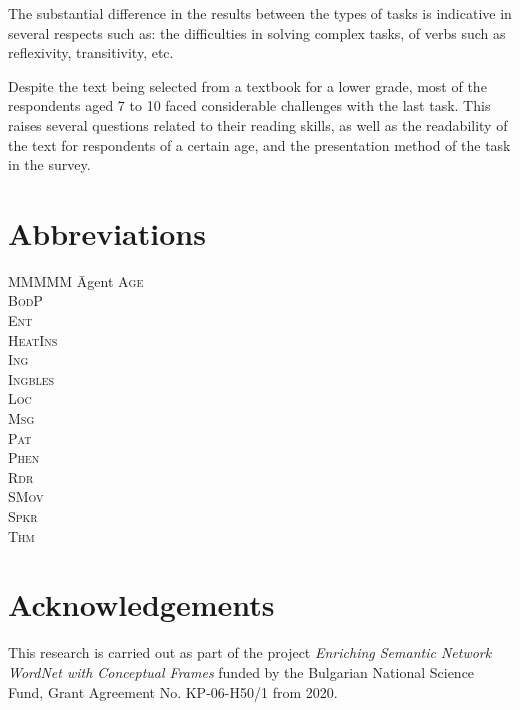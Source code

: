 \documentclass[output=paper,colorlinks,citecolor=brown]{langscibook}
\begin{document}
The substantial difference in the results between the types of tasks is indicative in several respects such as: the difficulties in solving complex tasks,  of verbs such as reflexivity, transitivity, etc.

Despite the text being selected from a textbook for a lower grade, most of the respondents aged 7 to 10 faced considerable challenges with the last task. This raises several questions related to their reading skills, as well as the readability of the text for respondents of a certain age, and the presentation method of the task in the survey.


\section*{Abbreviations}
\begin{multicols}{2}
\begin{tabbing}
MMMMM \= Agent\kill
\scshape Age \> \\
\scshape BodP \> \\
\scshape Ent \> \\
\scshape HeatIns \> \\
\scshape Ing \> \\
\scshape Ingbles \> \\
\scshape Loc \> \\
\scshape Msg \> \\
\scshape Pat \> \\
\scshape Phen \> \\
\scshape Rdr \> \\
\scshape SMov \> \\
\scshape Spkr \> \\
\scshape Thm \> \\
\end{tabbing}
\end{multicols}


\section*{Acknowledgements}

This research is carried out as part of the project \emph{Enriching Semantic Network WordNet with Conceptual Frames} funded by the Bulgarian National Science Fund, Grant Agreement No. KP-06-H50/1 from 2020.



{\sloppy\printbibliography[heading=subbibliography,notkeyword=this]}
\end{document}
